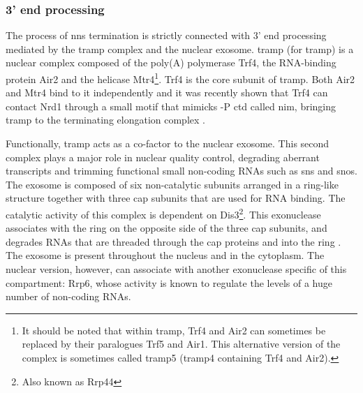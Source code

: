\subsubsection{3' end processing} \label{secTramp}

The process of \gls{nns} termination is strictly connected with 3' end processing mediated by the \gls{tramp} complex and the nuclear exosome.
\gls{tramp} (for \glsdesc{tramp}) is a nuclear complex composed of the poly(A) polymerase Trf4, the RNA-binding protein Air2 and the helicase Mtr4\footnote{It should be noted that within \gls{tramp}, Trf4 and Air2 can sometimes be replaced by their paralogues Trf5 and Air1. This alternative version of the complex is sometimes called \gls{tramp}5 (\gls{tramp}4 containing Trf4 and Air2).}.
Trf4 is the core subunit of \gls{tramp}.
Both Air2 and Mtr4 bind to it independently and it was recently shown that Trf4 can contact Nrd1 through a small motif that mimicks \serf{}-P \gls{ctd} called \gls{nim}, bringing \gls{tramp} to the terminating elongation complex \cite{tudek:2014:molecular}.

Functionally, \gls{tramp} acts as a co-factor to the nuclear exosome.
This second complex plays a major role in nuclear quality control, degrading aberrant transcripts and trimming functional small non-coding RNAs such as \gls{sns} and \gls{snos}.
The exosome is composed of six non-catalytic subunits arranged in a ring-like structure together with three cap subunits that are used for RNA binding.
The catalytic activity of this complex is dependent on Dis3\footnote{Also known as Rrp44}.
This \TtoF{} exonuclease associates with the ring on the opposite side of the three cap subunits, and degrades RNAs that are threaded through the cap proteins and into the ring \cite{makino:2015:rna}.
The exosome is present throughout the nucleus and in the cytoplasm.
The nuclear version, however, can associate with another exonuclease specific of this compartment: Rrp6, whose activity is known to regulate the levels of a huge number of non-coding RNAs.

